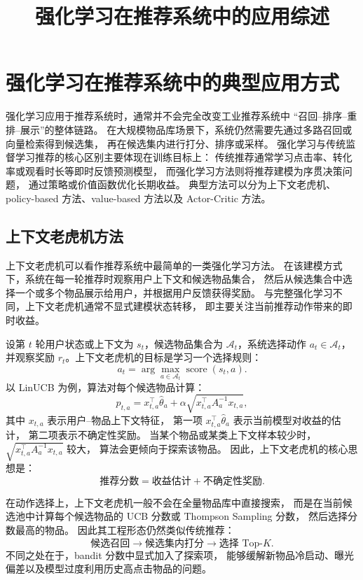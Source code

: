 \documentclass[11pt]{ctexart}
\title{强化学习在推荐系统中的应用综述}
\author{}
\date{}
\begin{document}
\maketitle
\section{强化学习在推荐系统中的典型应用方式}
\label{sec:rl_recsys_methods}

强化学习应用于推荐系统时，通常并不会完全改变工业推荐系统中
``召回--排序--重排--展示''的整体链路。
在大规模物品库场景下，系统仍然需要先通过多路召回或向量检索得到候选集，
再在候选集内进行打分、排序或采样。
强化学习与传统监督学习推荐的核心区别主要体现在训练目标上：
传统推荐通常学习点击率、转化率或观看时长等即时反馈预测模型，
而强化学习方法则将推荐建模为序贯决策问题，
通过策略或价值函数优化长期收益。
典型方法可以分为上下文老虎机、policy-based 方法、value-based 方法以及
Actor-Critic 方法。

\subsection{上下文老虎机方法}
\label{subsec:contextual_bandit_recsys}

上下文老虎机可以看作推荐系统中最简单的一类强化学习方法。
在该建模方式下，系统在每一轮推荐时观察用户上下文和候选物品集合，
然后从候选集合中选择一个或多个物品展示给用户，并根据用户反馈获得奖励。
与完整强化学习不同，上下文老虎机通常不显式建模状态转移，
即主要关注当前推荐动作带来的即时收益。

设第 \(t\) 轮用户状态或上下文为 \(s_t\)，候选物品集合为
\(\mathcal{A}_t\)，系统选择动作 \(a_t \in \mathcal{A}_t\)，
并观察奖励 \(r_t\)。上下文老虎机的目标是学习一个选择规则：
\[
a_t = \arg\max_{a \in \mathcal{A}_t} \operatorname{score}(s_t,a).
\]
以 LinUCB 为例，算法对每个候选物品计算：
\[
p_{t,a}
=
x_{t,a}^{\top}\hat{\theta}_a
+
\alpha
\sqrt{x_{t,a}^{\top}A_a^{-1}x_{t,a}},
\]
其中 \(x_{t,a}\) 表示用户--物品上下文特征，
第一项 \(x_{t,a}^{\top}\hat{\theta}_a\) 表示当前模型对收益的估计，
第二项表示不确定性奖励。
当某个物品或某类上下文样本较少时，
\(\sqrt{x_{t,a}^{\top}A_a^{-1}x_{t,a}}\) 较大，
算法会更倾向于探索该物品。
因此，上下文老虎机的核心思想是：
\[
\text{推荐分数}
=
\text{收益估计}
+
\text{不确定性奖励}.
\]

在动作选择上，上下文老虎机一般不会在全量物品库中直接搜索，
而是在当前候选池中计算每个候选物品的 UCB 分数或 Thompson Sampling 分数，
然后选择分数最高的物品。
因此其工程形态仍然类似传统推荐：
\[
\text{候选召回}
\rightarrow
\text{候选集内打分}
\rightarrow
\text{选择 Top-}K.
\]
不同之处在于，bandit 分数中显式加入了探索项，
能够缓解新物品冷启动、曝光偏差以及模型过度利用历史高点击物品的问题。
\end{document}
